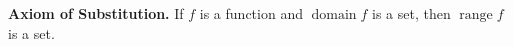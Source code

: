 \textbf{Axiom of Substitution.} If $f$ is a function and $\operatorname{domain} f$ is a set, then $\operatorname{range} f$ is a set.
